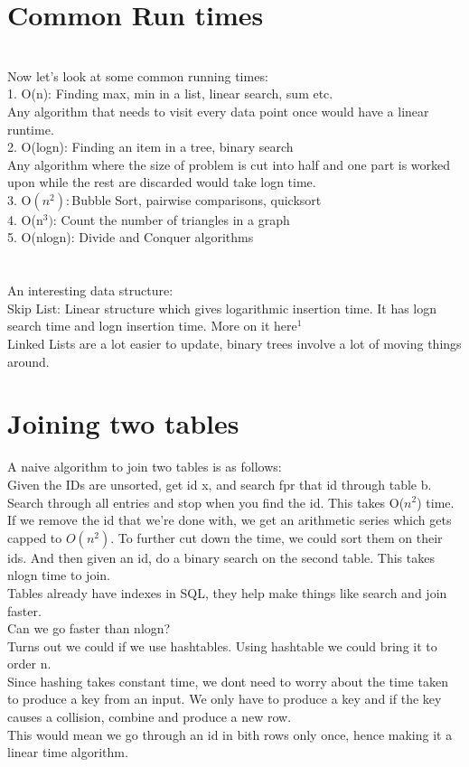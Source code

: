 \section{Common Run times}
\\ Now let's look at some common running times:
\\	1. O(n): Finding max, min in a list, linear search, sum etc. 
\\ Any algorithm that needs to visit every data point once would have a linear runtime.
\\	2. O(logn): Finding an item in a tree, binary search
\\ Any algorithm where the size of problem is cut into half and one part is worked upon while the rest are discarded would take logn time.
\\	3. O$(n^2) : $Bubble Sort, pairwise comparisons, quicksort
\\	4. O(n$^3)$: Count the number of triangles in a graph
\\	5. O(nlogn): Divide and Conquer algorithms
\\
\\
\\	An interesting data structure:
\\Skip List: Linear structure which gives logarithmic insertion time. It has logn search time and logn insertion time. More on it here$^1$ \\Linked Lists are a lot easier to update, binary trees involve a lot of moving things around.
\section{Joining two tables}
A naive algorithm to join two tables is as follows:
\\ Given the IDs are unsorted, get id x, and search fpr that id through table b. Search through all entries and stop when you find the id. This takes O($n^2$) time. If we remove the id that we're done with, we get an arithmetic series which gets capped to $O(n^2)$. To further cut down the time, we could sort them on their ids. And then given an id, do a binary search on the second table. This takes nlogn time to join.
\\ Tables already have indexes in SQL, they help make things like search and join faster.
\\ Can we go faster than nlogn?
\\Turns out we could if we use hashtables. Using hashtable we could bring it to order n.
\\Since hashing takes constant time, we dont need to worry about the time taken to produce a key from an input. We only have to produce a key and if the key causes a collision, combine and produce a new row.
\\ This would mean we go through an id in bith rows only once, hence making it a linear time algorithm.
